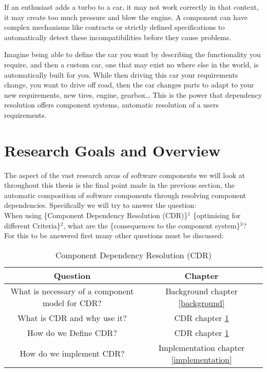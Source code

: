 \documentclass{report}
\begin{document}
If an enthusiast adds a turbo to a car, it may not work correctly in that context, it may create too much pressure and blow the engine.
A component can have complex mechanisms like contracts or strictly defined specifications to automatically detect these incompatibilities before they cause problems.

Imagine being able to define the car you want by describing the functionality you require, and then a custom car, one that may exist no where else in the world,
is automatically built for you. 
While then driving this car your requirements change, you want to drive off road, then the car changes parts to adapt to your new requirements, new tires, engine, gearbox\ldots
This is the power that dependency resolution offers component systems, automatic resolution of a users requirements.

\section{Research Goals and Overview}
{}The aspect of the vast research areas of software components we will look at throughout this thesis is the final point made in the previous section, 
{}the automatic composition of software components through resolving component dependencies.
{}Specifically we will try to answer the question:\\
{}When using \{Component Dependency Resolution (CDR)\}$^1$ \{optimising for different Criteria\}$^2$, what are the \{consequences to the component system\}$^3$? \\

{}For this to be answered first many other questions must be discussed:

{}\begin{table}[h!]
{}\begin{tabular}{|c|c|}
{} Question & Chapter \\ \hline
{}What is necessary of a component model for CDR? & Background chapter \ref{background}\\
{}What is CDR and why use it? & CDR chapter \ref{cdr}\\
{}How do we Define CDR? & CDR chapter \ref{cdr}\\
{}How do we implement CDR? & Implementation chapter \ref{implementation}
{}\end{tabular}
{}\caption{Component Dependency Resolution (CDR)}
{}\label{cdr}
{}\end{table}
\end{document}
